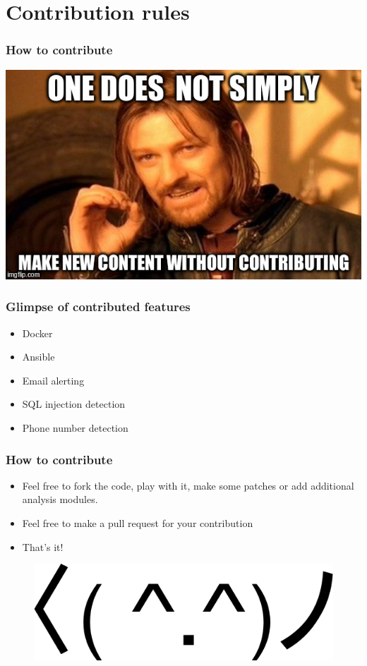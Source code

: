 \section{Contribution rules}
\begin{frame}
\frametitle{How to contribute}
    \centerline{\includegraphics[scale=0.5]{images/one-does-not-simply.jpeg}}
\end{frame}

\begin{frame}
    \frametitle{Glimpse of contributed features}
    \begin{itemize}
        \item Docker
        \item Ansible
        \item Email alerting
        \item SQL injection detection
        \item Phone number detection
    \end{itemize}
\end{frame}


\begin{frame}
\frametitle{How to contribute}
    \begin{itemize}
        \item Feel free to fork the code, play with it, make some patches or add additional analysis modules.
        \pause
        \item Feel free to make a pull request for your contribution
        \pause
        \item That's it!
    \end{itemize}
    \begin{figure}
        \includegraphics[scale=0.2]{images/dancing.png}
    \end{figure}
\end{frame}

